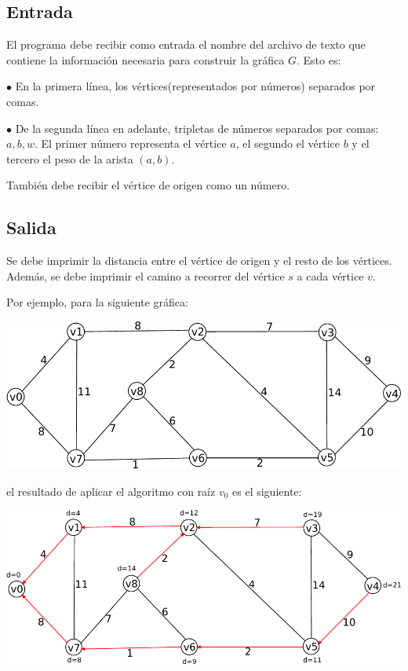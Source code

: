 \documentclass{article}
\begin{document}
\subsection{Entrada}

El programa debe recibir como entrada el nombre del archivo de texto que contiene la información necesaria para construir la gráfica $G$. Esto es:

$\bullet$ En la primera línea, los vértices(representados por números) separados por comas.

$\bullet$ De la segunda línea en adelante, tripletas de números separados por comas: $a,b,w$. El primer número representa el vértice $a$, el segundo el vértice $b$ y el tercero el peso de la arista $(a,b)$.

También debe recibir el vértice de origen como un número.

\subsection{Salida}

Se debe imprimir la distancia entre el vértice de origen y el resto de los vértices. Además, se debe imprimir el camino a recorrer del vértice $s$ a cada vértice $v$.

Por ejemplo, para la siguiente gráfica:

\includegraphics[scale=0.7]{dibujos/grafica}

el resultado de aplicar el algoritmo con raíz $v_0$ es el siguiente:

\includegraphics[scale=0.7]{dibujos/grafica2}
\end{document}
